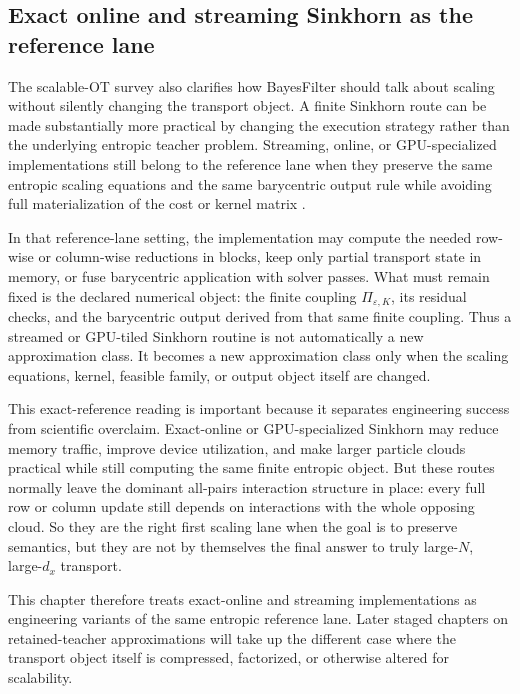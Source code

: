 \subsection{Exact online and streaming Sinkhorn as the reference lane}
\label{sec:bf-eot-reference-lane}

The scalable-OT survey also clarifies how BayesFilter should talk about scaling
without silently changing the transport object.  A finite Sinkhorn route can be
made substantially more practical by changing the execution strategy rather than
the underlying entropic teacher problem.  Streaming, online, or GPU-specialized
implementations still belong to the reference lane when they preserve the same
entropic scaling equations and the same barycentric output rule while avoiding
full materialization of the cost or kernel matrix \citep{feydy2019geomloss,charlier2021keops,ye2026flashsinkhorn,xiao2026fastsinkhorn}.

In that reference-lane setting, the implementation may compute the needed
row-wise or column-wise reductions in blocks, keep only partial transport state
in memory, or fuse barycentric application with solver passes.  What must remain
fixed is the declared numerical object: the finite coupling
\(\Pi_{\varepsilon,K}\), its residual checks, and the barycentric output derived
from that same finite coupling.  Thus a streamed or GPU-tiled Sinkhorn routine is
not automatically a new approximation class.  It becomes a new approximation
class only when the scaling equations, kernel, feasible family, or output object
itself are changed.

This exact-reference reading is important because it separates engineering success
from scientific overclaim.  Exact-online or GPU-specialized Sinkhorn may reduce
memory traffic, improve device utilization, and make larger particle clouds
practical while still computing the same finite entropic object.  But these routes
normally leave the dominant all-pairs interaction structure in place: every full
row or column update still depends on interactions with the whole opposing cloud.
So they are the right first scaling lane when the goal is to preserve semantics,
but they are not by themselves the final answer to truly large-\(N\), large-\(d_x\)
transport.

This chapter therefore treats exact-online and streaming implementations as
engineering variants of the same entropic reference lane.  Later staged chapters
on retained-teacher approximations will take up the different case where the
transport object itself is compressed, factorized, or otherwise altered for
scalability.

